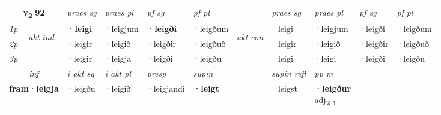 \noindent
\begin{tabular}{lllllllllll} \toprule
\multicolumn{2}{c}{\textbf{v{\textsubscript{2}}} \Large{\textbf{92}}}  &  \textit{praes sg}  & \textit{praes pl}  &\textit{ pf sg} & \textit{pf pl} &  &  \textit{praes sg}  & \textit{praes pl}  & \textit{pf sg} & \textit{pf pl } \\*
	\cmidrule{3-6} \cmidrule{8-11}
 {\textit{1p}} & \multirow{3}{*}{\begin{turn}{90}\textit{akt ind}\end{turn}} & \textbf{·leigi} & ·leigjum & \textbf{·leigði} & ·leigðum & \multirow{3}{*}{\begin{turn}{90}\textit{akt con}\end{turn}} &·leigi & ·leigjum & ·leigði & ·leigðum\\*
 {\textit{2p}} &  &  ·leigir  & ·leigið & ·leigðir & ·leigðuð & & ·leigir & ·leigið & ·leigðir & ·leigðuð \\*
{\textit{3p}} &  & ·leigir & ·leigja & ·leigði & ·leigðu & & ·leigi & ·leigi& ·leigði & ·leigðu \\*
\cmidrule{3-6} \cmidrule{8-11}

   \multicolumn{2}{c}{\textit{inf}}  & \textit{i akt sg} & \textit{i akt pl}   & \textit{presp} & \textit{supin} && \textit{supin refl} & \textit{pp m} \\*
  \multicolumn{2}{c}{\textbf{fram\allowbreak ·leigja}} & ·leigðu  & ·leigið   & ·leigjandi &  \textbf{·leigt} && ·leigst & \specialcell{\textbf{·leigður} \\ adj\textbf{\textsubscript{2-1}}} \\*
\end{tabular}

